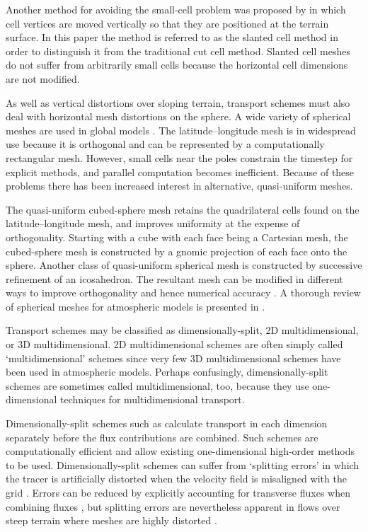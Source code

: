 Another method for avoiding the small-cell problem was proposed by \citep{shaw-weller2016} in which cell vertices are moved vertically so that they are positioned at the terrain surface.  In this paper the method is referred to as the slanted cell method in order to distinguish it from the traditional cut cell method.  Slanted cell meshes do not suffer from arbitrarily small cells because the horizontal cell dimensions are not modified.

As well as vertical distortions over sloping terrain, transport schemes must also deal with horizontal mesh distortions on the sphere.  A wide variety of spherical meshes are used in global models \citep{staniforth-thuburn2012}.  The latitude--longitude mesh is in widespread use because it is orthogonal and can be represented by a computationally rectangular mesh.  However, small cells near the poles constrain the timestep for explicit methods, and parallel computation becomes inefficient.  Because of these problems there has been increased interest in alternative, quasi-uniform meshes.

The quasi-uniform cubed-sphere mesh retains the quadrilateral cells found on the latitude--longitude mesh, and improves uniformity at the expense of orthogonality.  Starting with a cube with each face being a Cartesian mesh, the cubed-sphere mesh is constructed by a gnomic projection of each face onto the sphere.
Another class of quasi-uniform spherical mesh is constructed by successive refinement of an icosahedron.  The resultant mesh can be modified in different ways to improve orthogonality and hence numerical accuracy \citep{heikes-randall1995b,tomita2002}.  A thorough review of spherical meshes for atmospheric models is presented in \citep{staniforth-thuburn2012}.

Transport schemes may be classified as dimensionally-split, 2D multidimensional, or 3D multidimensional.  2D multidimensional schemes are often simply called `multidimensional' schemes since very few 3D multidimensional schemes have been used in atmospheric models.
Perhaps confusingly, dimensionally-split schemes are sometimes called multidimensional, too, because they use one-dimensional techniques for multidimensional transport.

Dimensionally-split schemes such as \citep{lin-rood1996,putman-lin2007,katta2015} calculate transport in each dimension separately before the flux contributions are combined.  Such schemes are computationally efficient and allow existing one-dimensional high-order methods to be used.
  Dimensionally-split schemes can suffer from `splitting errors' in which the tracer is artificially distorted when the velocity field is misaligned with the grid \citep{leonard1993}.  Errors can be reduced by explicitly accounting for transverse fluxes when combining fluxes \citep{leonard1996}, but splitting errors are nevertheless apparent in flows over steep terrain where meshes are highly distorted \citep{weller2017}.

